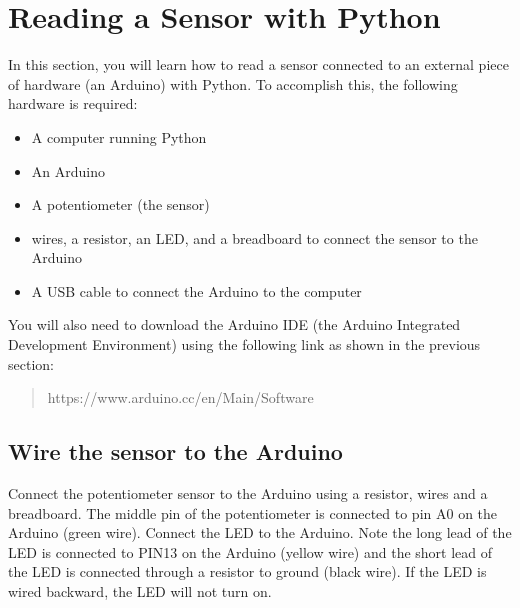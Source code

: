 \documentclass{book}
\providecommand{\tightlist}{%
      \setlength{\itemsep}{0pt}\setlength{\parskip}{0pt}}
\begin{document}
    
        \hypertarget{reading-a-sensor-with-python}{%
\section{Reading a Sensor with
Python}\label{reading-a-sensor-with-python}}
    




    
        In this section, you will learn how to read a sensor connected to an
external piece of hardware (an Arduino) with Python. To accomplish this,
the following hardware is required:

\begin{itemize}
\tightlist
\item
  A computer running Python
\item
  An Arduino
\item
  A potentiometer (the sensor)
\item
  wires, a resistor, an LED, and a breadboard to connect the sensor to
  the Arduino
\item
  A USB cable to connect the Arduino to the computer
\end{itemize}

You will also need to download the Arduino IDE (the Arduino Integrated
Development Environment) using the following link as shown in the
previous section:

\begin{quote}
https://www.arduino.cc/en/Main/Software
\end{quote}
    




    
        \hypertarget{wire-the-sensor-to-the-arduino}{%
\subsection{Wire the sensor to the
Arduino}\label{wire-the-sensor-to-the-arduino}}
    




    
        Connect the potentiometer sensor to the Arduino using a resistor, wires
and a breadboard. The middle pin of the potentiometer is connected to
pin A0 on the Arduino (green wire). Connect the LED to the Arduino. Note
the long lead of the LED is connected to PIN13 on the Arduino (yellow
wire) and the short lead of the LED is connected through a resistor to
ground (black wire). If the LED is wired backward, the LED will not turn
on.
\end{document}
